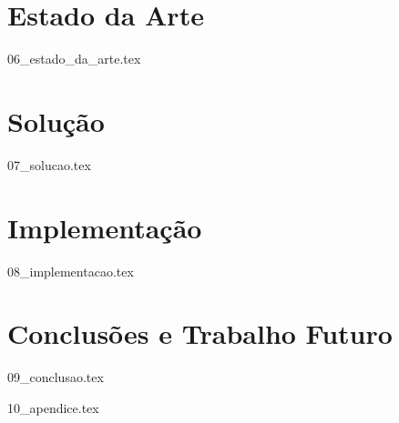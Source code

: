 \documentclass[
  oneside,
  11pt, a4paper,
  footinclude=true,
  headinclude=true,
  cleardoublepage=empty
]{scrbook}
\begin{document}
	\chapter{Estado da Arte}
    {06_estado_da_arte.tex}

	\chapter{Solução}
    {07_solucao.tex}

	\chapter{Implementação}
    {08_implementacao.tex}
		
	\chapter{Conclusões e Trabalho Futuro}
    {09_conclusao.tex}
			

	

	
    {10_apendice.tex}
	
\end{document}

